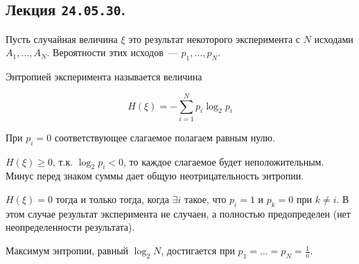 \subsection{%
  Лекция \texttt{24.05.30}.%
}


Пусть случайная величина \(\xi\) это результат некоторого эксперимента с \(N\)
исходами \(A_1, \dotsc, A_N\). Вероятности этих исходов~--- \(p_1, \dotsc,
p_N\).

\begin{definition}
  Энтропией эксперимента называется величина

  \begin{equation*}
    H (\xi) = -\sum_{i = 1}^N p_i \log_2 p_i 
  \end{equation*}

  При \(p_i = 0\) соответствующее слагаемое полагаем равным нулю.
\end{definition}

\begin{remark}
  \(H (\xi) \ge 0\), т.к. \(\log_2 p_i < 0\), то каждое слагаемое будет
  неположительным. Минус перед знаком суммы дает общую неотрицательность
  энтропии.
\end{remark}

\begin{remark}
  \(H (\xi) = 0\) тогда и только тогда, когда \(\exists i\) такое, что \(p_i =
  1\) и \(p_k = 0\) при \(k \neq i\). В этом случае результат эксперимента не
  случаен, а полностью предопределен (нет неопределенности результата).
\end{remark}

\begin{lemma}
  Максимум энтропии, равный \(\log_2 N\), достигается при \(p_1 = \dotsc = p_N =
  \frac{1}{n}\).
\end{lemma}

